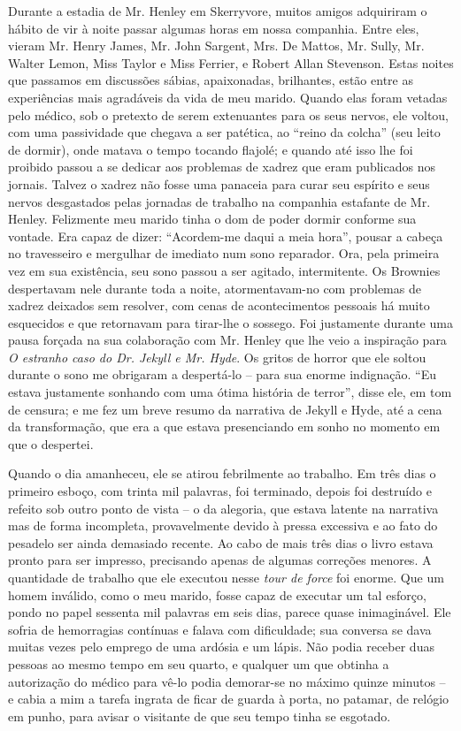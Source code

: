 Durante a estadia de Mr. Henley em Skerryvore, muitos amigos adquiriram
o hábito de vir à noite passar algumas horas em nossa companhia. 
Entre eles, vieram Mr. Henry James, Mr. John Sargent, Mrs. De Mattos,
Mr. Sully, Mr. Walter Lemon, Miss Taylor e Miss Ferrier, e Robert Allan
Stevenson.  Estas noites que passamos em discussões sábias,
apaixonadas, brilhantes, estão entre as experiências mais agradáveis da
vida de meu marido.  Quando elas foram vetadas pelo médico, sob o
pretexto de serem extenuantes para os seus nervos, ele voltou, com uma
passividade que chegava a ser patética, ao “reino da colcha” (seu leito
de dormir), onde matava o tempo tocando flajolé; e quando até isso lhe
foi proibido passou a se dedicar aos problemas de xadrez que eram
publicados nos jornais.  Talvez o xadrez não fosse uma panaceia para
curar seu espírito e seus nervos desgastados pelas jornadas de trabalho
na companhia estafante de Mr. Henley.  Felizmente meu marido tinha o
dom de poder dormir conforme sua vontade.  Era capaz de dizer:
“Acordem-me daqui a meia hora”, pousar a cabeça no travesseiro e
mergulhar de imediato num sono reparador.  Ora, pela primeira vez em
sua existência, seu sono passou a ser agitado, intermitente.  Os
Brownies despertavam nele durante toda a noite, atormentavam-no com
problemas de xadrez deixados sem resolver, com cenas de acontecimentos
pessoais há muito esquecidos e que retornavam para tirar-lhe o sossego.
 Foi justamente durante uma pausa forçada na sua colaboração com Mr.
Henley que lhe veio a inspiração para \textit{O estranho caso do Dr.
Jekyll e Mr. Hyde}.  Os gritos de horror que ele soltou durante o sono
me obrigaram a despertá-lo -- para sua enorme indignação.  “Eu estava
justamente sonhando com uma ótima história de terror”, disse ele, em
tom de censura; e me fez um breve resumo da narrativa de Jekyll e Hyde,
até a cena da transformação, que era a que estava presenciando em sonho
no momento em que o despertei.

Quando o dia amanheceu, ele se atirou febrilmente ao trabalho.  Em três
dias o primeiro esboço, com trinta mil palavras, foi terminado, depois
foi destruído e refeito sob outro ponto de vista -- o da alegoria, que
estava latente na narrativa mas de forma incompleta, provavelmente
devido à pressa excessiva e ao fato do pesadelo ser ainda demasiado
recente.  Ao cabo de mais três dias o livro estava pronto para ser
impresso, precisando apenas de algumas correções menores.  A quantidade
de trabalho que ele executou nesse \textit{tour de force} foi enorme. 
Que um homem inválido, como o meu marido, fosse capaz de executar um
tal esforço, pondo no papel sessenta mil palavras em seis dias, parece
quase inimaginável.  Ele sofria de hemorragias contínuas e falava com
dificuldade; sua conversa se dava muitas vezes pelo emprego de uma
ardósia e um lápis.  Não podia receber duas pessoas ao mesmo tempo em
seu quarto, e qualquer um que obtinha a autorização do médico para
vê-lo podia demorar-se no máximo quinze minutos -- e cabia a mim a
tarefa ingrata de ficar de guarda à porta, no patamar, de relógio em
punho, para avisar o visitante de que seu tempo tinha se esgotado.

